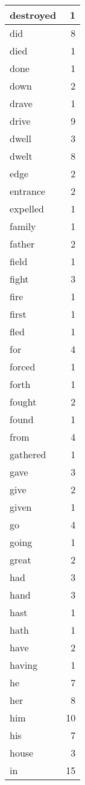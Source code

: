 \begin{center}
\begin{longtable}{l|r}
destroyed & 1 \\ \hline
did & 8 \\ \hline
died & 1 \\ \hline
done & 1 \\ \hline
down & 2 \\ \hline
drave & 1 \\ \hline
drive & 9 \\ \hline
dwell & 3 \\ \hline
dwelt & 8 \\ \hline
edge & 2 \\ \hline
entrance & 2 \\ \hline
expelled & 1 \\ \hline
family & 1 \\ \hline
father & 2 \\ \hline
field & 1 \\ \hline
fight & 3 \\ \hline
fire & 1 \\ \hline
first & 1 \\ \hline
fled & 1 \\ \hline
for & 4 \\ \hline
forced & 1 \\ \hline
forth & 1 \\ \hline
fought & 2 \\ \hline
found & 1 \\ \hline
from & 4 \\ \hline
gathered & 1 \\ \hline
gave & 3 \\ \hline
give & 2 \\ \hline
given & 1 \\ \hline
go & 4 \\ \hline
going & 1 \\ \hline
great & 2 \\ \hline
had & 3 \\ \hline
hand & 3 \\ \hline
hast & 1 \\ \hline
hath & 1 \\ \hline
have & 2 \\ \hline
having & 1 \\ \hline
he & 7 \\ \hline
her & 8 \\ \hline
him & 10 \\ \hline
his & 7 \\ \hline
house & 3 \\ \hline
in & 15 \\ \hline

\end{longtable}
\end{center}
